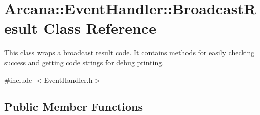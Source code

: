 \hypertarget{class_arcana_1_1_event_handler_1_1_broadcast_result}{}\section{Arcana\+:\+:Event\+Handler\+:\+:Broadcast\+Result Class Reference}
\label{class_arcana_1_1_event_handler_1_1_broadcast_result}


This class wraps a broadcast result code. It contains methods for easily checking success and getting code strings for debug printing.  




{\ttfamily \#include $<$Event\+Handler.\+h$>$}

\subsection*{Public Member Functions}
